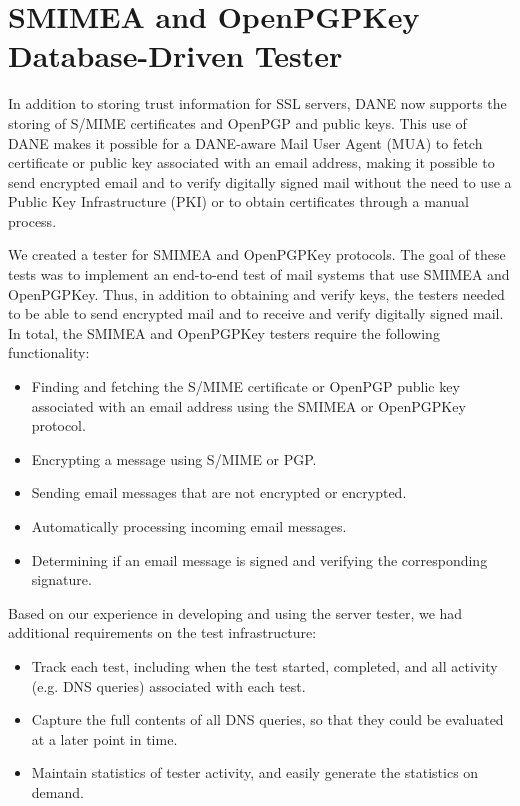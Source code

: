 \documentclass[preprint,3p]{elsarticle}
\begin{document}
\section{SMIMEA and OpenPGPKey Database-Driven Tester}
In addition to storing trust information for SSL servers, DANE now
supports the storing of S/MIME certificates and OpenPGP and public keys. This use
of DANE makes it possible for a DANE-aware Mail User Agent (MUA) to
fetch certificate or public key associated with an email address,
making it possible to send encrypted email and to verify digitally
signed mail without the need to use a Public Key Infrastructure (PKI)
or to obtain certificates through a manual process.

We created a tester for SMIMEA and OpenPGPKey protocols. The goal of
these tests was to implement an end-to-end test of mail systems that
use SMIMEA and OpenPGPKey. Thus, in addition to obtaining and verify
keys, the testers needed to be able to send encrypted mail and to
receive and verify digitally signed mail. In total, the 
SMIMEA and OpenPGPKey testers require the following functionality:

\begin{itemize}
\item Finding and fetching the S/MIME certificate or OpenPGP public
  key associated with an email address using the SMIMEA or OpenPGPKey
  protocol.
\item Encrypting a message using S/MIME or PGP.
\item Sending email messages that are not encrypted or encrypted.
\item Automatically processing incoming email messages.
\item Determining if an email message is signed and verifying the
  corresponding signature. 
\end{itemize}

\noindent Based on our experience in developing and using the server tester, we
had additional requirements on the test infrastructure:

\begin{itemize}
\item Track each test, including when the test started, completed, and
  all activity (e.g. DNS queries) associated with each test.
\item Capture the full contents of all DNS queries, so that they could
  be evaluated at a later point in time.
\item Maintain statistics of tester activity, and easily generate the
  statistics on demand.
\end{itemize}
\end{document}
